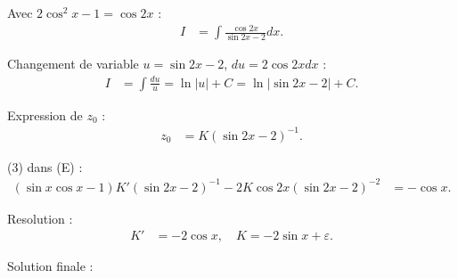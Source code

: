 Avec $2 \cos^2 x - 1 = \cos 2x$ :
\begin{align*}
    I &= \int \frac{\cos 2x}{\sin 2x - 2} dx.
\end{align*}

Changement de variable $u = \sin 2x - 2$, $du = 2 \cos 2x dx$ :
\begin{align*}
    I &= \int \frac{du}{u} = \ln |u| + C = \ln |\sin 2x - 2| + C.
\end{align*}

Expression de $z_0$ :
\begin{align*}
    z_0 &= K (\sin 2x - 2)^{-1}.
\end{align*}

(3) dans (E) :
\begin{align*}
    (\sin x \cos x - 1) K' (\sin 2x - 2)^{-1} - 2K \cos 2x (\sin 2x - 2)^{-2} &= - \cos x.
\end{align*}

Resolution :
\begin{align*}
    K' &= -2 \cos x, \quad K = -2 \sin x + \varepsilon.
\end{align*}

Solution finale : 

